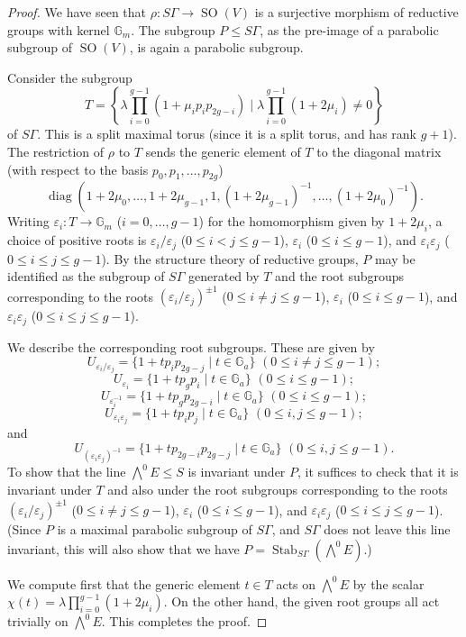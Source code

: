 \documentclass{article} %
\numberwithin{equation}{section}
\newcommand{\G}{\mathbb{G}}
\DeclareMathOperator{\SO}{SO}
\DeclareMathOperator{\Stab}{Stab}
\begin{document}
\begin{proof}
    We have seen that $\rho : S \Gamma \to \SO(V)$ is a surjective morphism of reductive groups with kernel $\G_m$. The subgroup $P \leq S \Gamma$, as the pre-image of a parabolic subgroup of $\SO(V)$, is again a parabolic subgroup. 
    
    Consider the subgroup
    \[ T = \left\{ \lambda \prod_{i=0}^{g-1} (1 + \mu_i p_i p_{2g-i}) \mid \lambda \prod_{i=0}^{g-1} (1 + 2 \mu_i) \neq 0 \right\} \]
    of $S \Gamma$. This is a split maximal torus (since it is a split torus, and has rank $g+1$). The restriction of $\rho$ to $T$ sends the generic element of $T$ to the diagonal matrix (with respect to the basis $p_0, p_1, \dots, p_{2g}$)
    \begin{equation}\label{eqn_rho_on_T} \operatorname{diag}(1 + 2 \mu_0, \dots, 1 + 2 \mu_{g-1}, 1, (1 + 2 \mu_{g-1})^{-1}, \dots, (1 + 2 \mu_0)^{-1}). 
    \end{equation}
    Writing $\varepsilon_i : T \to \G_m$ ($i = 0, \dots, g-1$) for the homomorphism given by $1 + 2 \mu_i$, a choice of positive roots is $\varepsilon_i / \varepsilon_j$ ($0 \leq i < j \leq g-1$), $\varepsilon_i$ ($0 \leq i \leq g-1$), and $\varepsilon_i \varepsilon_j$ ($0 \leq i \leq j \leq g-1$). By the structure theory of reductive groups, $P$ may be identified as the subgroup of $S \Gamma$ generated by $T$ and the root subgroups corresponding to the roots $(\varepsilon_i / \varepsilon_j)^{\pm 1}$ ($0 \leq i \neq j \leq g-1$), $\varepsilon_i$ ($0 \leq i \leq g-1$), and $\varepsilon_i \varepsilon_j$ ($0 \leq i \leq j \leq g-1$). 

    We describe the corresponding root subgroups. These are given by
    \[ U_{\varepsilon_i / \varepsilon_j} = \{ 1 + t p_i p_{2g-j} \mid t \in \G_a \} \,\, (0 \leq i \neq j \leq g-1); \]
     \[ U_{\varepsilon_i} = \{ 1 + t p_g p_i \mid t \in \G_a \} \,\, (0 \leq i\leq g-1); \]
   \[ U_{\varepsilon_i^{-1}} = \{ 1 + t p_g p_{2g-i} \mid t \in \G_a \} \,\, (0 \leq i\leq g-1); \]
    \[ U_{\varepsilon_i \varepsilon_j} = \{ 1 + t p_i p_j \mid t \in \G_a \} \,\, (0 \leq i, j \leq g-1); \]
    and
     \[ U_{(\varepsilon_i \varepsilon_j)^{-1}} = \{ 1 + t p_{2g-i} p_{2g-j} \mid t \in \G_a \} \,\, (0 \leq i, j \leq g-1). \]
     To show that the line $\bigwedge^0 E \leq S$ is invariant under $P$, it suffices to check that it is invariant under $T$ and also under the root subgroups corresponding to the roots $(\varepsilon_i / \varepsilon_j)^{\pm 1}$ ($0 \leq i \neq j \leq g-1$), $\varepsilon_i$ ($0 \leq i \leq g-1$), and $\varepsilon_i \varepsilon_j$ ($0 \leq i \leq j \leq g-1$). (Since $P$ is a maximal parabolic subgroup of $S \Gamma$, and $S \Gamma$ does not leave this line invariant, this will also show that we have $P = \Stab_{S \Gamma}(\bigwedge^0 E)$.) 

     We compute first that the generic element $t \in T$ acts on $\bigwedge^0 E$ by the scalar $\chi(t) = \lambda \prod_{i=0}^{g-1} (1 + 2 \mu_i)$. On the other hand, the given root groups all act trivially on $\bigwedge^0 E$. This completes the proof. 
\end{proof}
\end{document}

